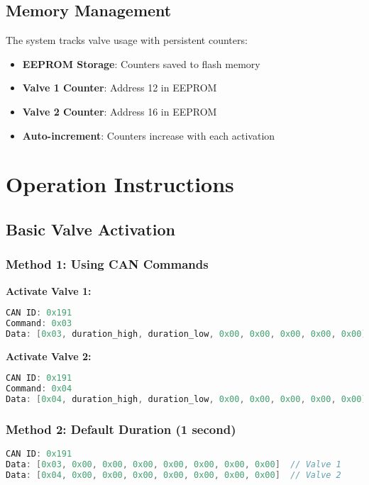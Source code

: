 \documentclass[11pt,a4paper]{article}
\begin{document}
\subsection{Memory Management}
The system tracks valve usage with persistent counters:
\begin{itemize}
    \item \textbf{EEPROM Storage}: Counters saved to flash memory
    \item \textbf{Valve 1 Counter}: Address 12 in EEPROM
    \item \textbf{Valve 2 Counter}: Address 16 in EEPROM
    \item \textbf{Auto-increment}: Counters increase with each activation
\end{itemize}

\section{Operation Instructions}

\subsection{Basic Valve Activation}

\subsubsection{Method 1: Using CAN Commands}

\textbf{Activate Valve 1:}
\begin{lstlisting}[language=C, caption=Valve 1 Activation Command]
CAN ID: 0x191
Command: 0x03
Data: [0x03, duration_high, duration_low, 0x00, 0x00, 0x00, 0x00, 0x00]
\end{lstlisting}

\textbf{Activate Valve 2:}
\begin{lstlisting}[language=C, caption=Valve 2 Activation Command]
CAN ID: 0x191
Command: 0x04
Data: [0x04, duration_high, duration_low, 0x00, 0x00, 0x00, 0x00, 0x00]
\end{lstlisting}

\subsubsection{Method 2: Default Duration (1 second)}
\begin{lstlisting}[language=C, caption=Default Duration Commands]
CAN ID: 0x191
Data: [0x03, 0x00, 0x00, 0x00, 0x00, 0x00, 0x00, 0x00]  // Valve 1
Data: [0x04, 0x00, 0x00, 0x00, 0x00, 0x00, 0x00, 0x00]  // Valve 2
\end{lstlisting}
\end{document}
